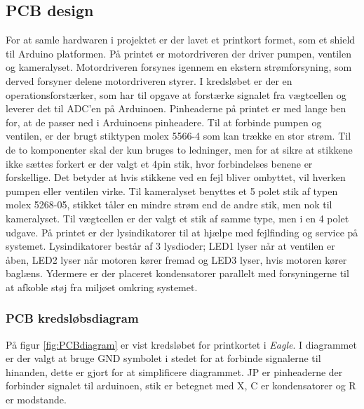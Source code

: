  
\subsection{PCB design} 
For at samle hardwaren i projektet er der lavet et printkort formet, som et shield til Arduino platformen. På printet er motordriveren der driver pumpen, ventilen og kameralyset. Motordriveren forsynes igennem en ekstern strømforsyning, som derved forsyner delene motordriveren styrer. I kredsløbet er der en operationsforstærker, som har til opgave at forstærke signalet fra vægtcellen og leverer det til ADC'en på Arduinoen. Pinheaderne på printet er med lange ben for, at de passer ned i Arduinoens pinheadere. Til at forbinde pumpen og ventilen, er der brugt stiktypen molex 5566-4 som kan trække en stor strøm. Til de to komponenter skal der kun bruges to ledninger, men for at sikre at stikkene ikke sættes forkert er der valgt et 4pin stik, hvor forbindelses benene er forskellige. Det betyder at hvis stikkene ved en fejl bliver ombyttet, vil hverken pumpen eller ventilen virke. Til kameralyset benyttes et 5 polet stik af typen molex 5268-05, stikket tåler en mindre strøm end de andre stik, men nok til kameralyset. Til vægtcellen er der valgt et stik af samme type, men i en 4 polet udgave. På printet er der lysindikatorer til at hjælpe med fejlfinding og service på systemet. Lysindikatorer består af 3 lysdioder; LED1 lyser når at ventilen er åben, LED2 lyser når motoren kører fremad og LED3 lyser, hvis motoren kører baglæns. Ydermere er der placeret kondensatorer parallelt med forsyningerne til at afkoble støj fra miljøet omkring systemet.

\newpage
\subsubsection{PCB kredsløbsdiagram}
På figur \ref{fig:PCBdiagram} er vist kredsløbet for printkortet i \textit{Eagle}. I diagrammet er der valgt at bruge GND symbolet i stedet for at forbinde signalerne til hinanden, dette er gjort for at simplificere diagrammet. JP er pinheaderne der forbinder signalet til arduinoen, stik er betegnet med X, C er kondensatorer og R er modstande.

